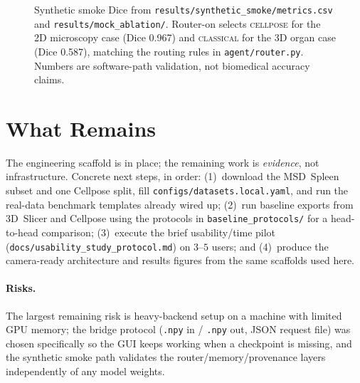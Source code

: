 \documentclass[10pt,letterpaper,twocolumn]{article}
\begin{document}
\begin{figure}[t]
\centering
{}
\caption{Synthetic smoke Dice from
\texttt{results/synthetic\_smoke/metrics.csv} and
\texttt{results/mock\_ablation/}. Router-on selects \textsc{cellpose}
for the 2D microscopy case (Dice 0.967) and \textsc{classical} for
the 3D organ case (Dice 0.587), matching the routing rules in
\texttt{agent/router.py}. Numbers are software-path validation, not
biomedical accuracy claims.}
\label{fig:dice}
\end{figure}

\section{What Remains}

The engineering scaffold is in place; the remaining work is
\emph{evidence}, not infrastructure. Concrete next steps, in order:
(1)~download the MSD~Spleen subset and one Cellpose split, fill
\texttt{configs/datasets.local.yaml}, and run the real-data
benchmark templates already wired up; (2)~run baseline exports from
3D~Slicer and Cellpose using the protocols in
\texttt{baseline\_protocols/} for a head-to-head comparison;
(3)~execute the brief usability/time pilot
(\texttt{docs/usability\_study\_protocol.md}) on $3$--$5$ users; and
(4)~produce the camera-ready architecture and results figures from
the same scaffolds used here.

\paragraph{Risks.} The largest remaining risk is heavy-backend setup
on a machine with limited GPU memory; the bridge protocol
(\texttt{.npy} in / \texttt{.npy} out, JSON request file) was chosen
specifically so the GUI keeps working when a checkpoint is missing,
and the synthetic smoke path validates the router/memory/provenance
layers independently of any model weights.
\end{document}
